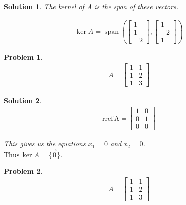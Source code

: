 \documentclass{article}
\newtheorem{problem}{Problem}
\newtheorem*{solution}{Solution}
\newcommand{\rref}[1]{\mathrm{rref \, #1}}
\DeclareMathOperator{\Span}{span}
\begin{document}
\begin{solution}
The kernel of A is the span of these vectors.

\begin{align*}
\ker A = \Span \left( \begin{bmatrix} 1 \\ 1 \\ -2 \end{bmatrix}, \begin{bmatrix} 1 \\ -2 \\ 1 \end{bmatrix}  \right)
\end{align*}

\end{solution}

\begin{problem}
\begin{align*}
A = \begin{bmatrix}1 & 1 \\ 1 & 2 \\ 1 & 3 \end{bmatrix}
\end{align*}
\end{problem}

\begin{solution}
\begin{align*}
\rref{A} = \begin{bmatrix}1 & 0 \\ 0 & 1 \\ 0 & 0 \end{bmatrix}
\end{align*}

This gives us the equations $x_{1} = 0$ and $x_{2} = 0$. \\

$\mathrm{Thus} \, \ker A = \{ \vec{0} \}$.

\end{solution}

\begin{problem}
\begin{align*}
A = \begin{bmatrix}1 & 1 \\ 1 & 2 \\ 1 & 3 \end{bmatrix}
\end{align*}
\end{problem}
\end{document}

